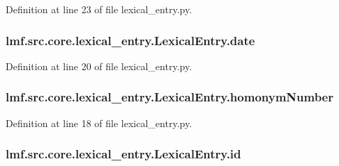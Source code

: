 Definition at line 23 of file lexical\+\_\+entry.\+py.

\hypertarget{classlmf_1_1src_1_1core_1_1lexical__entry_1_1_lexical_entry_ac6d96435547dea66e1433966098249b8}{
\subsubsection[{date}]{\setlength{\rightskip}{0pt plus 5cm}lmf.\+src.\+core.\+lexical\+\_\+entry.\+Lexical\+Entry.\+date}}\label{classlmf_1_1src_1_1core_1_1lexical__entry_1_1_lexical_entry_ac6d96435547dea66e1433966098249b8}


Definition at line 20 of file lexical\+\_\+entry.\+py.

\hypertarget{classlmf_1_1src_1_1core_1_1lexical__entry_1_1_lexical_entry_a402073c8f71f2f779725c6aeefa5df49}{
\subsubsection[{homonym\+Number}]{\setlength{\rightskip}{0pt plus 5cm}lmf.\+src.\+core.\+lexical\+\_\+entry.\+Lexical\+Entry.\+homonym\+Number}}\label{classlmf_1_1src_1_1core_1_1lexical__entry_1_1_lexical_entry_a402073c8f71f2f779725c6aeefa5df49}


Definition at line 18 of file lexical\+\_\+entry.\+py.

\hypertarget{classlmf_1_1src_1_1core_1_1lexical__entry_1_1_lexical_entry_a28fe2bf7e53e223a6919bb38b6d55256}{
\subsubsection[{id}]{\setlength{\rightskip}{0pt plus 5cm}lmf.\+src.\+core.\+lexical\+\_\+entry.\+Lexical\+Entry.\+id}}\label{classlmf_1_1src_1_1core_1_1lexical__entry_1_1_lexical_entry_a28fe2bf7e53e223a6919bb38b6d55256}


